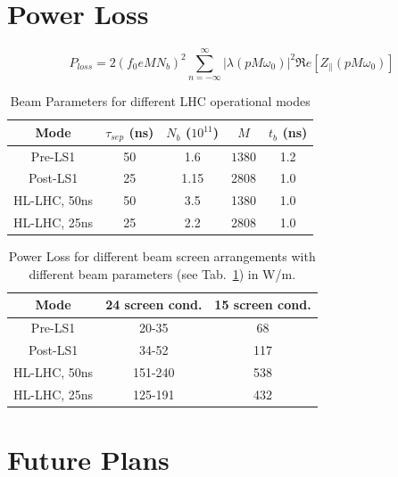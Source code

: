 \documentclass[a4paper,
              ]{jacow}
\begin{document}
\section{Power Loss}



\begin{equation}
P_{loss} = 2 \left( f_{0} e M  N_{b}\right)^{2} \displaystyle\sum\limits_{n = -\infty}^{\infty}  \left| \lambda \left( p M \omega_{0} \right)  \right|^{2} \Re{}e \left[ Z_{\parallel} \left( p M \omega_{0} \right) \right]
\label{eqn:powLoss}
\end{equation}


\begin{table}
\caption{Beam Parameters for different LHC operational modes}
\label{tab:beamPara}
\begin{center}
\begin{tabular}{c | c | c | c | c}
Mode & $\tau_{sep}$ (ns) & $N_{b}$ ($10^{11}$) & $ M $ & $t_{b}$ (ns) \\ \hline 
Pre-LS1 & 50 & 1.6 & $ 1380 $ & 1.2 \\ \hline 
Post-LS1 & 25 & 1.15 & 2808 & 1.0 \\ \hline 
HL-LHC, 50ns & 50 & 3.5 & 1380 & 1.0 \\ \hline 
HL-LHC, 25ns & 25 & 2.2 & 2808 & 1.0 \\ 
\end{tabular}
\end{center}
\end{table}

\begin{table}
\caption{Power Loss for different beam screen arrangements with different beam parameters (see Tab.~\ref{tab:beamPara}) in W/m.}
\label{tab:powLoss}
\begin{center}
\begin{tabular}{c | c | c}
Mode & 24 screen cond. & 15 screen cond. \\ \hline 
Pre-LS1 & 20-35 & 68 \\ \hline 
Post-LS1 & 34-52 & 117 \\ \hline 
HL-LHC, 50ns & 151-240 & 538  \\ \hline 
HL-LHC, 25ns & 125-191 & 432  \\ 
\end{tabular}
\end{center}
\end{table}

\section{Future Plans}
\end{document}
